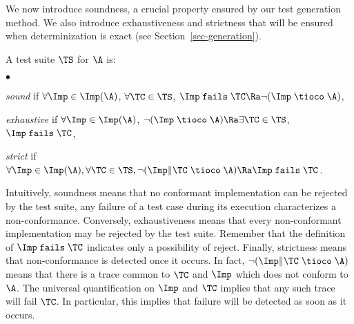 \documentclass{LMCS}
\theoremstyle{plain}\newtheorem{proposition}[thm]{Proposition}
\begin{document}
We now introduce soundness, a crucial property ensured by our test generation method. 
We also introduce exhaustiveness 
 and strictness that will be ensured  
when determinization is exact (see Section~\ref{sec-generation}).

\begin{defi}
A  test suite $\TS$ for $\A$ is:
\begin{iteMize}{$\bullet$}
\item {\em sound} if
$\forall \Imp \in \Imp(\A)$, $\forall \TC \in \TS$, $\Imp \; {\tt fails} \; \TC \Ra \neg (\Imp \; \tioco \;\A)$,
\item {\em exhaustive} if 
$\forall \Imp \in \Imp(\A)$, $\neg (\Imp \; \tioco \; \A) \Ra \exists \TC \in \TS$, $\Imp \; {\tt fails} \; \TC$,
\item {\em strict} if  $\forall \Imp \in \Imp(\A), \forall \TC \in \TS, 
\neg (\Imp \| \TC \; \tioco \; \A) \Ra \Imp \; {\tt fails} \; \TC$.
\end{iteMize}
\end{defi}

Intuitively, soundness means that no conformant implementation can be
rejected by the test suite, \ie any failure of a test case during its
execution characterizes a non-conformance.  Conversely, exhaustiveness means
that every non-conformant implementation may be rejected by the test
suite.  Remember that the definition of $\Imp \; {\tt fails} \; \TC$
indicates only a possibility of reject.  Finally, strictness means
that non-conformance is detected once it occurs.  In fact, $\neg (\Imp
\| \TC \; \tioco \; \A)$ means that there is a trace common to $\TC$
and $\Imp$ which does not conform to $\A$.  The universal
quantification on $\Imp$ and $\TC$ implies that any such trace will
fail $\TC$. In particular, this implies that failure will be detected
as soon as it occurs.  
\end{document}
